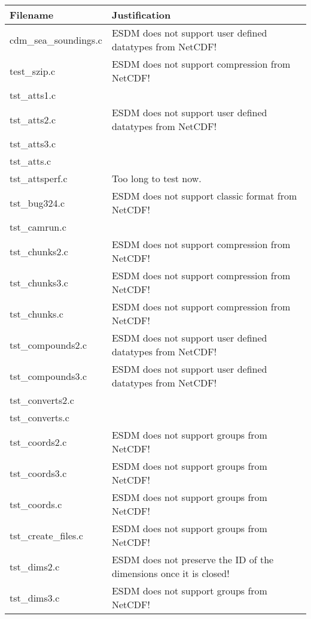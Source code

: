 \begin{table}[H]
\centering
\begin{tabular}{|l|l|}
\hline
Filename & Justification \\ \hline \hline
cdm\_sea\_soundings.c   & ESDM does not support user defined datatypes from NetCDF!          \\ \hline
test\_szip.c   &  ESDM does not support compression from NetCDF!         \\ \hline
tst\_atts1.c   &           \\ \hline
tst\_atts2.c   &  ESDM does not support user defined datatypes from NetCDF!         \\ \hline
tst\_atts3.c   &           \\ \hline
tst\_atts.c   &           \\ \hline
tst\_attsperf.c   &  Too long to test now.         \\ \hline
tst\_bug324.c   &  ESDM does not support classic format from NetCDF!         \\ \hline
tst\_camrun.c   &           \\ \hline
tst\_chunks2.c   &  ESDM does not support compression from NetCDF!         \\ \hline
tst\_chunks3.c   & ESDM does not support compression from NetCDF!       \\ \hline
tst\_chunks.c   &  ESDM does not support compression from NetCDF!       \\ \hline
tst\_compounds2.c   &  ESDM does not support user defined datatypes from NetCDF!         \\ \hline
tst\_compounds3.c   &  ESDM does not support user defined datatypes from NetCDF!         \\ \hline
tst\_converts2.c   &           \\ \hline
tst\_converts.c   &           \\ \hline
tst\_coords2.c   &   ESDM does not support groups from NetCDF!       \\ \hline
tst\_coords3.c   &  ESDM does not support groups from NetCDF!         \\ \hline
tst\_coords.c   &  ESDM does not support groups from NetCDF!         \\ \hline
tst\_create\_files.c   &   ESDM does not support groups from NetCDF!        \\ \hline
tst\_dims2.c   & ESDM does not preserve the ID of the dimensions once it is closed!       \\ \hline
tst\_dims3.c   & ESDM does not support groups from NetCDF!      \\ \hline

\end{tabular}
\end{table}
